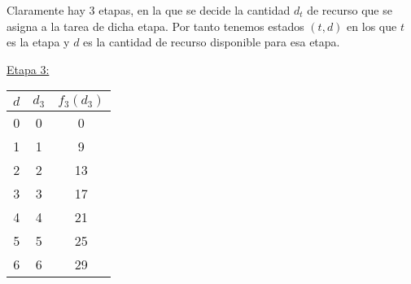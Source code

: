 \documentclass[MIOP.tex]{subfiles}
\begin{document}
\begin{solucion}
Claramente hay 3 etapas, en la que se decide la cantidad $d_t$ de recurso que se asigna a la tarea de dicha etapa. Por tanto tenemos estados $(t,d)$ en los que $t$ es la etapa y $d$ es la cantidad de recurso disponible para esa etapa.

\underline{Etapa 3:}
\begin{center}
\begin{tabular}{|c|c|c|}
\hline
$d$ & $d_3$ & $f_3(d_3)$\\
\hline
0 & 0 & 0\\
1 & 1 & 9\\
2 & 2 & 13\\
3 & 3 & 17\\
4 & 4 & 21\\
5 & 5 & 25\\
6 & 6 & 29\\
\hline
\end{tabular}
\end{center}


\end{solucion}
\end{document}
